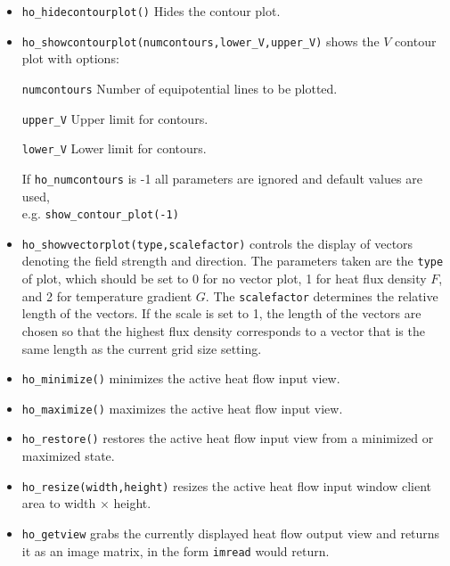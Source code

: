 \begin{itemize}
\texttt{gscale} Set to 0 for a colour density plot or 1 for a grey scale
density plot.

\texttt{upper} Sets the upper display limit for the density plot.

\texttt{lower} Sets the lower display limit for the density plot.

\texttt{type} Sets the type of density plot. A value of 0 plots temperature, 1
plots the magnitude of $F$, and 2 plots the magnitude of $G$

\item \texttt{ho\_hidecontourplot()} Hides the contour plot.

\item \texttt{ho\_showcontourplot(numcontours,lower{\_}V,upper{\_}V)} shows the
$V$ contour plot with options:

\texttt{numcontours} Number of equipotential lines to be plotted.

\texttt{upper{\_}V} Upper limit for contours.

\texttt{lower{\_}V} Lower limit for contours.

If \texttt{ho\_numcontours} is -1 all parameters are ignored and
default values are used, \\ e.g. \texttt{show{\_}contour{\_}plot(-1)}

\item \texttt{ho\_showvectorplot(type,scalefactor)}
controls the display of vectors denoting the field strength and
direction. The parameters taken are the \texttt{type} of plot,
which should be set to 0 for no vector plot, 1 for heat flux density
$F$, and 2 for temperature gradient $G$. The \texttt{scalefactor}
determines the relative length of the vectors. If the scale is set
to 1, the length of the vectors are chosen so that the highest flux
density corresponds to a vector that is the same length as the
current grid size setting.

\item{\tt ho\_minimize()} minimizes the active heat flow input view.

\item{\tt ho\_maximize()} maximizes the active heat flow input view.

\item{\tt ho\_restore()} restores the active heat flow input view from a
 minimized or maximized state.

\item{\tt ho\_resize(width,height)} resizes the active heat flow input
 window client area to width $\times$ height.
\item{\tt ho\_getview} grabs the currently displayed heat flow output view and
 returns it as an image matrix, in the form \texttt{imread} would return.

\end{itemize}

